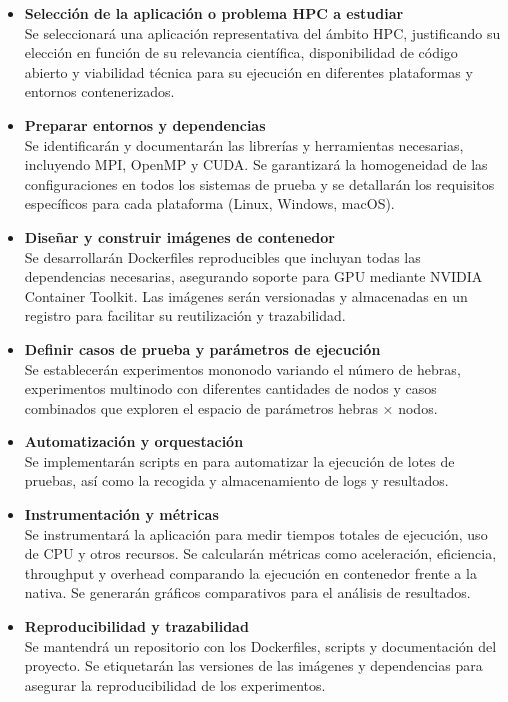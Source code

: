 \begin{itemize}
      \item \textbf{Selección de la aplicación o problema HPC a estudiar} \\
            Se seleccionará una aplicación representativa del ámbito HPC, justificando su elección en función de su relevancia científica, disponibilidad de código abierto y viabilidad técnica para su ejecución en diferentes plataformas y entornos contenerizados.

      \item \textbf{Preparar entornos y dependencias} \\
            Se identificarán y documentarán las librerías y herramientas necesarias, incluyendo MPI, OpenMP y CUDA. Se garantizará la homogeneidad de las configuraciones en todos los sistemas de prueba y se detallarán los requisitos específicos para cada plataforma (Linux, Windows, macOS).

      \item \textbf{Diseñar y construir imágenes de contenedor} \\
            Se desarrollarán Dockerfiles reproducibles que incluyan todas las dependencias necesarias, asegurando soporte para GPU mediante NVIDIA Container Toolkit. Las imágenes serán versionadas y almacenadas en un registro para facilitar su reutilización y trazabilidad.

      \item \textbf{Definir casos de prueba y parámetros de ejecución} \\
            Se establecerán experimentos mononodo variando el número de hebras, experimentos multinodo con diferentes cantidades de nodos y casos combinados que exploren el espacio de parámetros hebras × nodos.

      \item \textbf{Automatización y orquestación} \\
            Se implementarán scripts en para automatizar la ejecución de lotes de pruebas, así como la recogida y almacenamiento de logs y resultados.

      \item \textbf{Instrumentación y métricas} \\
            Se instrumentará la aplicación para medir tiempos totales de ejecución, uso de CPU y otros recursos. Se calcularán métricas como aceleración, eficiencia, throughput y overhead comparando la ejecución en contenedor frente a la nativa. Se generarán gráficos comparativos para el análisis de resultados.

      \item \textbf{Reproducibilidad y trazabilidad} \\
            Se mantendrá un repositorio con los Dockerfiles, scripts y documentación del proyecto. Se etiquetarán las versiones de las imágenes y dependencias para asegurar la reproducibilidad de los experimentos.
\end{itemize}

